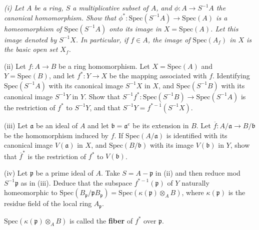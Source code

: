 \begin{problem}\em
(i) Let $A$ be a ring, $S$ a multiplicative subset of $A$, and $\phi:A\to S^{-1}A$ the canonical homomorphism. Show that $\phi^*:\mathrm{Spec}(S^{-1}A)\to\mathrm{Spec}(A)$ is a homeomorphism of $\mathrm{Spec}(S^{-1}A)$ onto its image in $X=\mathrm{Spec}(A)$. Let this image denoted by $S^{-1}X$. In particular, if $f\in A$, the image of $\mathrm{Spec}(A_f)$ in $X$ is the basic open set $X_f$.\par
(ii) Let $f:A\to B$ be a ring homomorphism. Let $X=\mathrm{Spec}(A)$ and $Y=\mathrm{Spec}(B)$, and let $f^*:Y\to X$ be the mapping associated with $f$. Identifying $\mathrm{Spec}(S^{-1}A)$ with its canonical image $S^{-1}X$ in $X$, and $\mathrm{Spec}(S^{-1}B)$ with its canonical image $S^{-1}Y$ in $Y$. Show that $S^{-1}f^*:\mathrm{Spec}(S^{-1}B)\to\mathrm{Spec}(S^{-1}A)$ is the restriction of $f^*$ to $S^{-1}Y$, and that $S^{-1}Y=f^{*-1}(S^{-1}X)$.\par
(iii) Let $\mathfrak{a}$ be an ideal of $A$ and let $\mathfrak{b}=\mathfrak{a}^e$ be its extension in $B$. Let $\overline{f}:A/\mathfrak{a}\to B/\mathfrak{b}$ be the homomorphism induced by $f$. If $\mathrm{Spec}(A/\mathfrak{a})$ is identified with its canonical image $V(\mathfrak{a})$ in $X$, and $\mathrm{Spec}(B/\mathfrak{b})$ with its image $V(\mathfrak{b})$ in $Y$, show that $\overline{f}^*$ is the restriction of $f^*$ to $V(\mathfrak{b})$.\par
(iv) Let $\mathfrak{p}$ be a prime ideal of $A$. Take $S=A-\mathfrak{p}$ in (ii) and then reduce mod $S^{-1}\mathfrak{p}$ as in (iii). Deduce that the subspace $f^{*-1}(\mathfrak{p})$ of $Y$ naturally homeomorphic to $\mathrm{Spec}(B_\mathfrak{p}/\mathfrak{p}B_\mathfrak{p})=\mathrm{Spec}(\kappa(\mathfrak{p})\otimes_AB)$, where $\kappa(\mathfrak{p})$ is the residue field of the local ring $A_\mathfrak{p}$.\par
$\mathrm{Spec}(\kappa(\mathfrak{p})\otimes_AB)$ is called the \textbf{fiber} of $f^*$ over $\mathfrak{p}$.
\end{problem}
